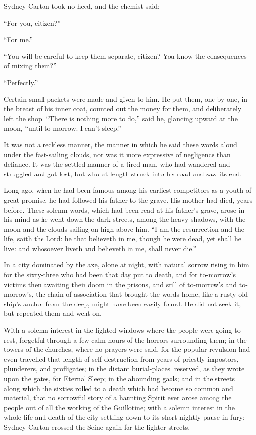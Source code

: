 Sydney Carton took no heed, and the chemist said:

``For you, citizen?''

``For me.''

``You will be careful to keep them separate, citizen?  You know the
consequences of mixing them?''

``Perfectly.''

Certain small packets were made and given to him.  He put them, one
by one, in the breast of his inner coat, counted out the money for
them, and deliberately left the shop.  ``There is nothing more to do,''
said he, glancing upward at the moon, ``until to-morrow.  I can't sleep.''

It was not a reckless manner, the manner in which he said these words
aloud under the fast-sailing clouds, nor was it more expressive of
negligence than defiance.  It was the settled manner of a tired man,
who had wandered and struggled and got lost, but who at length struck
into his road and saw its end.

Long ago, when he had been famous among his earliest competitors as a
youth of great promise, he had followed his father to the grave.
His mother had died, years before.  These solemn words, which had
been read at his father's grave, arose in his mind as he went down
the dark streets, among the heavy shadows, with the moon and the
clouds sailing on high above him.  ``I am the resurrection and the
life, saith the Lord:  he that believeth in me, though he were dead,
yet shall he live:  and whosoever liveth and believeth in me, shall
never die.''

In a city dominated by the axe, alone at night, with natural sorrow
rising in him for the sixty-three who had been that day put to death,
and for to-morrow's victims then awaiting their doom in the prisons,
and still of to-morrow's and to-morrow's, the chain of association
that brought the words home, like a rusty old ship's anchor from the
deep, might have been easily found.  He did not seek it, but repeated
them and went on.

With a solemn interest in the lighted windows where the people were
going to rest, forgetful through a few calm hours of the horrors
surrounding them; in the towers of the churches, where no prayers
were said, for the popular revulsion had even travelled that length
of self-destruction from years of priestly impostors, plunderers, and
profligates; in the distant burial-places, reserved, as they wrote
upon the gates, for Eternal Sleep; in the abounding gaols; and in the
streets along which the sixties rolled to a death which had become so
common and material, that no sorrowful story of a haunting Spirit
ever arose among the people out of all the working of the Guillotine;
with a solemn interest in the whole life and death of the city
settling down to its short nightly pause in fury; Sydney Carton
crossed the Seine again for the lighter streets.

